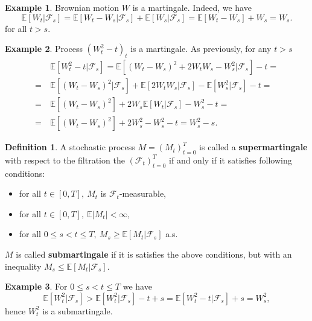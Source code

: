 \documentclass[a4paper,12pt, oneside]{book}
\theoremstyle{definition}
\newtheorem{mydef}{Definition}[chapter]
\newtheorem{example}{Example}[chapter]
\theoremstyle{remark}
\def\E{{\mathbb{E}}}
\begin{document}
\begin{example}
 Brownian motion $W$ is a martingale. Indeed, we have
 \begin{equation*}
  \E[W_t|\mathcal{F}_s] = \E[W_t-W_s|\mathcal{F}_s] + \E[W_s|\mathcal{F}_s] = \E[W_t-W_s] + W_s = W_s.
 \end{equation*}
 for all $t > s$.
\end{example}
\begin{example}
 \label{ex:angleWt}
 Process $(W_t^2-t)_t$ is a martingale. As previously, for any $t > s$
 \begin{equation*}
  \begin{split}
       & \E[W_t^2-t|\mathcal{F}_s] = \E[(W_t-W_s)^2 + 2W_tW_s - W_s^2|\mathcal{F}_s] -t =\\ 
    =\ & \E[(W_t-W_s)^2|\mathcal{F}_s] + \E[2W_tW_s|\mathcal{F}_s] - \E[W_s^2|\mathcal{F}_s] -t = \\
    =\ & \E[(W_t-W_s)^2] + 2W_s\E[W_t|\mathcal{F}_s] - W_s^2 -t = \\
    =\ & \E[(W_t-W_s)^2] + 2W_s^2 - W_s^2 -t = W_s^2 - s.
  \end{split}
 \end{equation*}
\end{example}

\begin{mydef}
 A stochastic process $M=(M_t)_{t=0}^T$ is called a \textbf{supermartingale} with respect to the filtration the $(\mathcal{F}_t)_{t=0}^T$ if and only if it satisfies following conditions:
 \begin{itemize}
  \item for all $t \in [0,T],\ M_t$ is $\mathcal{F}_t$-measurable,
  \item for all $t \in [0,T],\ \E|M_t| < \infty$,
  \item for all $0 \leq s < t \leq T,\  M_s \geq \E[M_t|\mathcal{F}_s]$  a.s.
 \end{itemize}
 $M$ is called \textbf{submartingale} if it is satisfies the above conditions, but with an inequality $ M_s \leq \E[M_t|\mathcal{F}_s]$.
\end{mydef}
\begin{example}
 For $0 \leq s < t \leq T$ we have
 \[ \E[W_t^2|\mathcal{F}_s] > \E[W_t^2|\mathcal{F}_s] - t + s = \E[W_t^2 - t|\mathcal{F}_s] + s = W_s^2, \]
 hence $W_t^2$ is a submartingale.
\end{example}
\end{document}
